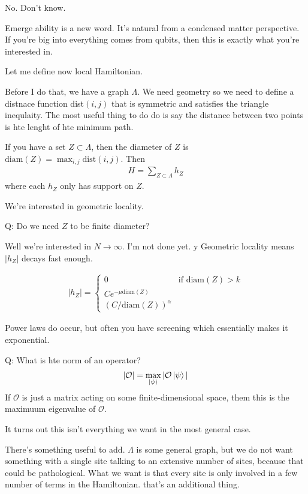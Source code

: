 No. Don't know.

Emerge ability is a new word.
It's natural from a condensed matter perspective.
If you're big into everything comes from qubits,
then this is exactly what you're interested in.

Let me define now local Hamiltonian.

Before I do that, we have a graph $\Lambda$.
We need geometry so we need to define a distnace function dist$(i,j)$
that is symmetric and satisfies the triangle inequlaity.
The most useful thing to do do is say the distance between two points is hte
lenght of hte minimum path.

If you have a set $Z\subset \Lambda$,
then the diameter of $Z$ is $\mathrm{diam}(Z)=\max_{i,j}\mathrm{dist}(i, j)$.
Then
\begin{align}
    H = \sum_{Z\subset\Lambda} h_Z
\end{align}
where each $h_Z$ only has support on $Z$.

We're interested in geometric locality.

Q: Do we need $Z$ to be finite diameter?

Well we're interested in $N\to\infty$.
I'm not done yet.
y
Geometric locality means $|h_Z|$ decays fast enough.

\begin{align}
    |h_Z| =
    \begin{cases}
        0 & \text{if }\mathrm{diam}(Z) > k\\
        C e^{-\mu \mathrm{diam}(Z)}\\
        {(C/\mathrm{diam}(Z))}^\alpha
    \end{cases}
\end{align}

Power laws do occur, but often you have screening which essentially makes it
exponential.

Q: What is hte norm of an operator?
\begin{align}
    |\mathcal{O}| = \max_{\ket{\psi}} |\mathcal{O}\ket{\psi}|
\end{align}
If $\mathcal{O}$ is just a matrix acting on some finite-dimensional space, them
this is the maximuum eigenvalue of $\mathcal{O}$.

It turns out this isn't everything we want in the most general case.

There's something useful to add.
$\Lambda$ is some general graph,
but we do not want something with a single site talking to an extensive number
of sites,
because that could be pathological.
What we want is that every site is only involved in a few number of terms in the
Hamiltonian.
that's an additional thing.

